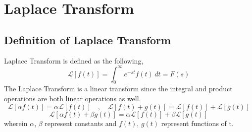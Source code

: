 \chapter{Laplace Transform}
\begin{comment}
Laplace Transform Header
\end{comment}
\section{Definition of Laplace Transform}
\begin{comment}
\end{comment}
Laplace Transform is defined as the following,
$$\mathcal{L}[f(t)] = \int^{\infty}_{0}e^{-st}f(t)\,dt = F(s)$$
The Laplace Transform is a linear transform since the integral and product operations are both linear operations as well.
$$\mathcal{L}[\alpha f(t)] = \alpha\mathcal{L}[f(t)]\quad,\quad\mathcal{L}[f(t) + g(t)] = \mathcal{L}[f(t)] + \mathcal{L}[g(t)]$$
$$\mathcal{L}[\alpha f(t) + \beta g(t)] = \alpha\mathcal{L}[f(t)] + \beta\mathcal{L}[g(t)]$$
wherein $\alpha$, $\beta$ represent constants and $f(t)$, $g(t)$ represent functions of t.
